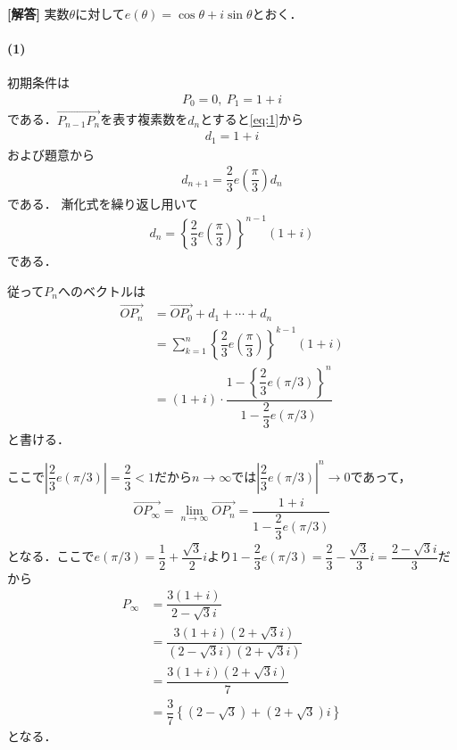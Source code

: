 \documentclass[../../main.tex]{subfiles}
\begin{document}
\begin{oframed}
  
\end{oframed}

{\bf [解答]}
実数$\theta$に対して$e(\theta)=\cos\theta+i\sin\theta$とおく．

\paragraph{(1)}

初期条件は
\begin{align}
  P_0=0,\ P_1=1+i \label{eq:1}
\end{align}
である．$\overrightarrow{P_{n-1}P_n}$を表す複素数を$d_n$とすると\cref{eq:1}から
\begin{align}
  d_1 = 1+i \label{eq:2}
\end{align}
および題意から
\begin{align}
  d_{n+1}=\dfrac{2}{3}e\left(\dfrac{\pi}{3}\right)d_n \label{eq:3}
\end{align}
である．
漸化式を繰り返し用いて
\begin{align}
  d_n=\left\{\dfrac{2}{3}e\left(\dfrac{\pi}{3}\right)\right\}^{n-1}(1+i) \label{eq:4}
\end{align}
である．

従って$P_n$へのベクトルは
\begin{align}
  \overrightarrow{OP_n}
  &=\overrightarrow{OP_0}+d_1+\cdots+d_n \\
  &=\sum_{k=1}^n\left\{\dfrac{2}{3}e\left(\dfrac{\pi}{3}\right)\right\}^{k-1}(1+i) \\
  &=(1+i)\cdot\dfrac{1-\left\{\dfrac{2}{3}e(\pi/3)\right\}^n}{1-\dfrac{2}{3}e(\pi/3)} \label{eq:5}
\end{align}
と書ける．

ここで$\left|\dfrac{2}{3}e(\pi/3)\right|=\dfrac{2}{3}<1$だから$n\to\infty$では$\left|\dfrac{2}{3}e(\pi/3)\right|^{n}\to 0$であって，
\begin{align}
  \overrightarrow{OP_\infty} = \lim_{n\to\infty}\overrightarrow{OP_n}=\dfrac{1+i}{1-\dfrac{2}{3}e(\pi/3)}
\end{align}
となる．ここで$e(\pi/3)=\dfrac{1}{2}+\dfrac{\sqrt{3}}{2}i$より$1-\dfrac{2}{3}e(\pi/3)=\dfrac{2}{3}-\dfrac{\sqrt{3}}{3}i=\dfrac{2-\sqrt{3}i}{3}$だから
\begin{align}
  P_\infty
  &=\dfrac{3(1+i)}{2-\sqrt{3}i} \\
  &=\dfrac{3(1+i)(2+\sqrt{3}i)}{(2-\sqrt{3}i)(2+\sqrt{3}i)}\\
  &=\dfrac{3(1+i)(2+\sqrt{3}i)}{7} \\
  &= \dfrac{3}{7}\left\{(2-\sqrt{3})+(2+\sqrt{3})i\right\} \label{eq:6}
\end{align}
となる．
\end{document}
